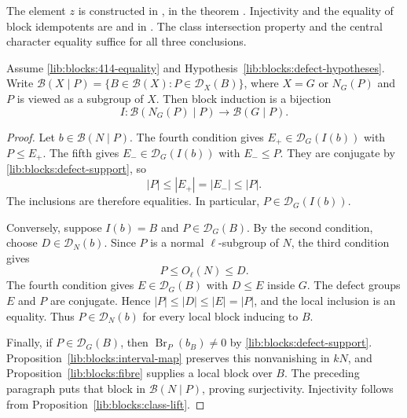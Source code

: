 \begin{implementation}
The element $z$ is constructed in
, in the theorem
.
Injectivity and the equality of block idempotents are
and 
in .
The class intersection property and the central character equality
suffice for all three conclusions.
\end{implementation}

\begin{theorem}
\label{lib:blocks:exact-defect}
Assume \eqref{lib:blocks:414-equality} and
Hypothesis~\ref{lib:blocks:defect-hypotheses}. Write
$\mathcal B(X\mid P)=\{B\in\mathcal B(X):P\in\mathcal D_X(B)\}$,
where $X=G$ or $N_G(P)$ and $P$ is viewed as a subgroup of $X$.
Then block induction is a bijection
\[
 I:\mathcal B(N_G(P)\mid P)\longrightarrow\mathcal B(G\mid P).
\]
\end{theorem}
\begin{proof}
Let $b\in\mathcal B(N\mid P)$. The fourth condition gives
$E_+\in\mathcal D_G(I(b))$ with $P\leq E_+$.
The fifth gives $E_-\in\mathcal D_G(I(b))$ with $E_-\leq P$.
They are conjugate by
\eqref{lib:blocks:defect-support}, so
\[
 |P|\leq|E_+|=|E_-|\leq|P|.
\]
The inclusions are therefore equalities. In particular,
$P\in\mathcal D_G(I(b))$.

Conversely, suppose $I(b)=B$ and $P\in\mathcal D_G(B)$.
By the second condition, choose $D\in\mathcal D_N(b)$. Since
$P$ is a normal $\ell$-subgroup of $N$, the third condition gives
\[
 P\leq O_\ell(N)\leq D.
\]
The fourth condition gives $E\in\mathcal D_G(B)$ with
$D\leq E$ inside $G$. The defect groups $E$ and $P$ are conjugate. Hence
$|P|\leq|D|\leq|E|=|P|$, and the local inclusion is an equality.
Thus $P\in\mathcal D_N(b)$ for every local block inducing to $B$.

Finally, if $P\in\mathcal D_G(B)$, then
$\operatorname{Br}_P(b_B)\ne0$ by
\eqref{lib:blocks:defect-support}. Proposition~\ref{lib:blocks:interval-map}
preserves this nonvanishing in $kN$, and
Proposition~\ref{lib:blocks:fibre} supplies a local block over $B$.
The preceding paragraph puts that block in $\mathcal B(N\mid P)$,
proving surjectivity. Injectivity follows from
Proposition~\ref{lib:blocks:class-lift}.
\end{proof}

